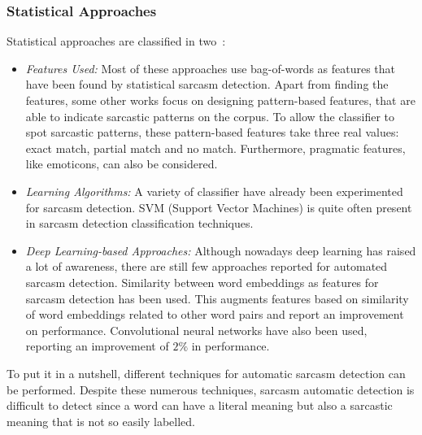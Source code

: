 \subsubsection{Statistical Approaches}
Statistical approaches are classified in two~\cite{joshi2017automatic}:
\begin{itemize}
	\item \textit{Features Used:} Most of these approaches use bag-of-words as features that have been found by statistical sarcasm detection. Apart from finding the features, some other works focus on designing pattern-based features, that are able to indicate sarcastic patterns on the corpus. To allow the classifier to spot sarcastic patterns, these pattern-based features take three real values: exact match, partial match and no match. Furthermore, pragmatic features, like emoticons, can also be considered.
	\item \textit{Learning Algorithms:} A variety of classifier have already been experimented for sarcasm detection. SVM (Support Vector Machines) is quite often present in sarcasm detection classification techniques.
	\item \textit{Deep Learning-based Approaches:} Although nowadays deep learning has raised a lot of awareness, there are still few approaches reported for automated sarcasm detection. Similarity between word embeddings as features for sarcasm detection has been used. This augments features based on similarity of word embeddings related to other word pairs and report an improvement on performance. Convolutional neural networks have also been used, reporting an improvement of $2\%$ in performance.
\end{itemize}

To put it in a nutshell, different techniques for automatic sarcasm detection can be performed. Despite these numerous techniques, sarcasm automatic detection is difficult to detect since a word can have a literal meaning but also a sarcastic meaning that is not so easily labelled.
